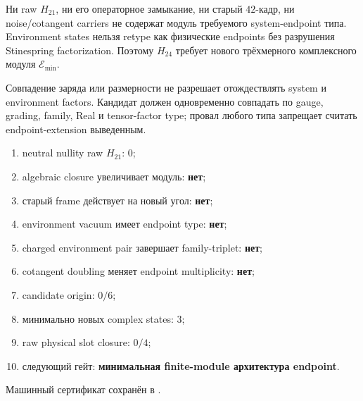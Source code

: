 \begin{theorem}
Ни raw $H_{21}$, ни его операторное замыкание, ни старый $42$-кадр, ни
noise/cotangent carriers не содержат модуль требуемого system-endpoint
типа. Environment states нельзя retype как физические endpoints без
разрушения Stinespring factorization. Поэтому $H_{24}$ требует нового
трёхмерного комплексного модуля $\mathcal E_{\min}$.
\end{theorem}

\begin{nogocriterion}
Совпадение заряда или размерности не разрешает отождествлять system и
environment factors. Кандидат должен одновременно совпадать по gauge,
grading, family, Real и tensor-factor type; провал любого типа запрещает
считать endpoint-extension выведенным.
\end{nogocriterion}

\begin{protocol}\begin{enumerate}
\item neutral nullity raw $H_{21}$: \textbf{$0$};
\item algebraic closure увеличивает модуль: \textbf{нет};
\item старый frame действует на новый угол: \textbf{нет};
\item environment vacuum имеет endpoint type: \textbf{нет};
\item charged environment pair завершает family-triplet: \textbf{нет};
\item cotangent doubling меняет endpoint multiplicity: \textbf{нет};
\item candidate origin: \textbf{$0/6$};
\item минимально новых complex states: \textbf{$3$};
\item raw physical slot closure: \textbf{$0/4$};
\item следующий гейт: \textbf{минимальная finite-module архитектура endpoint}.
\end{enumerate}\end{protocol}

Машинный сертификат сохранён в
.